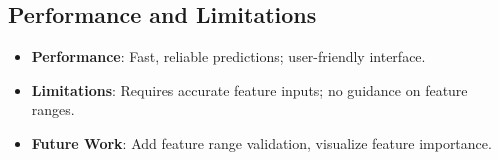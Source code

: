 \documentclass[a4paper,12pt]{article}
\begin{document}
\subsection{Performance and Limitations}
\begin{itemize}[noitemsep]
    \item \textbf{Performance}: Fast, reliable predictions; user-friendly interface.
    \item \textbf{Limitations}: Requires accurate feature inputs; no guidance on feature ranges.
    \item \textbf{Future Work}: Add feature range validation, visualize feature importance.
\end{itemize}

\end{document}
